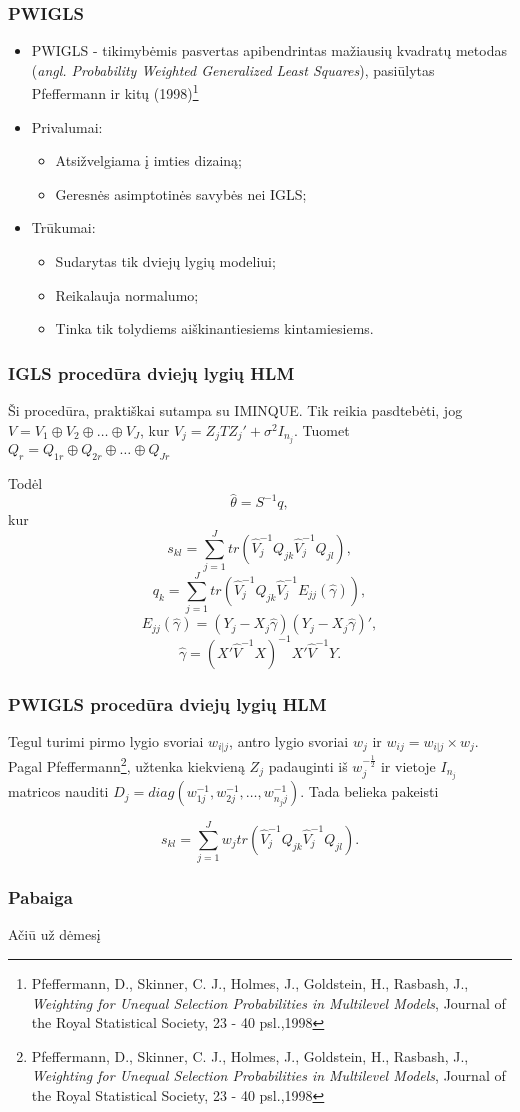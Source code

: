 \documentclass[utf8,hyperref={unicode,pdftex}]{beamer}
\begin{document}
\begin{frame}
\frametitle{PWIGLS}
\begin{itemize}
\item PWIGLS - tikimybėmis pasvertas apibendrintas mažiausių kvadratų metodas (\textit{angl. Probability Weighted Generalized Least Squares}), pasiūlytas Pfeffermann ir kitų (1998)\footnote{Pfeffermann, D., Skinner, C. J., Holmes, J., Goldstein, H., Rasbash, J., \textit{Weighting for Unequal Selection Probabilities in Multilevel Models}, Journal of the Royal Statistical Society, 23 - 40 psl.,1998}
\item Privalumai:
\begin{itemize}
\item Atsižvelgiama į imties dizainą;
\item Geresnės asimptotinės savybės nei IGLS;
\end{itemize}
\item Trūkumai:
\begin{itemize}
\item Sudarytas tik dviejų lygių modeliui;
\item Reikalauja normalumo;
\item Tinka tik tolydiems aiškinantiesiems kintamiesiems.
\end{itemize}
\end{itemize}
\end{frame}

\begin{frame}
\frametitle{IGLS procedūra dviejų lygių HLM}
Ši procedūra, praktiškai sutampa su IMINQUE. Tik reikia pasdtebėti, jog $V = V_1\oplus V_2\oplus\dots\oplus V_J$, kur $V_j=Z_jTZ_j'+\sigma^2I_{n_j}$. Tuomet $Q_r=Q_{1r}\oplus Q_{2r} \oplus \dots \oplus Q_{Jr}$

Todėl 
\[\hat{\theta}=S^{-1}q,\] kur
\[s_{kl}=\sum^J_{j=1}tr\left(\hat{V}^{-1}_j Q_{jk}\hat{V}^{-1}_j Q_{jl}\right),\]
\[q_k=\sum^J_{j=1}tr\left(\hat{V}^{-1}_j Q_{jk}\hat{V}^{-1}_j E_{jj}(\hat{\gamma})\right),\]
\[E_{jj}(\hat{\gamma})=(Y_j-X_j\hat{\gamma})(Y_j-X_j\hat{\gamma})',
\]
\[\hat{\gamma}=(X'\hat{V}^{-1}X)^{-1}X'\hat{V}^{-1}Y.\]
\end{frame}

\begin{frame}
\frametitle{PWIGLS procedūra dviejų lygių HLM}
Tegul turimi pirmo lygio svoriai $w_{i|j}$, antro lygio svoriai $w_j$ ir $w_{ij}=w_{i|j}\times w_j$.
Pagal Pfeffermann\footnote{Pfeffermann, D., Skinner, C. J., Holmes, J., Goldstein, H., Rasbash, J., \textit{Weighting for Unequal Selection Probabilities in Multilevel Models}, Journal of the Royal Statistical Society, 23 - 40 psl.,1998}, užtenka kiekvieną $Z_j$ padauginti iš $w^{-\frac{1}{2}}_j$ ir vietoje $I_{n_j}$ matricos nauditi $D_j=diag(w^{-1}_{1j}, w^{-1}_{2j}, \dots , w^{-1}_{n_jj})$. Tada belieka pakeisti 

\[s_{kl}=\sum^J_{j=1}w_j tr\left(\hat{V}^{-1}_j Q_{jk}\hat{V}^{-1}_j Q_{jl}\right).\]

\end{frame}


\begin{frame}
\frametitle{Pabaiga}
\huge
Ačiū už dėmesį
\end{frame}
\end{document}
